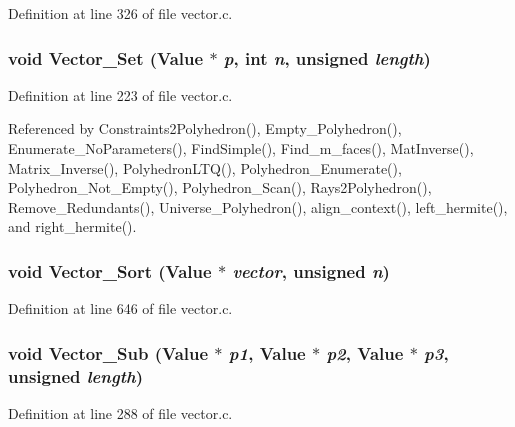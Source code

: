 Definition at line 326 of file vector.c.
\subsubsection{\setlength{\rightskip}{0pt plus 5cm}void Vector\_\-Set (Value $\ast$ {\em p}, int {\em n}, unsigned {\em length})}\label{vector_8c_a9}




Definition at line 223 of file vector.c.

Referenced by Constraints2Polyhedron(), Empty\_\-Polyhedron(), Enumerate\_\-No\-Parameters(), Find\-Simple(), Find\_\-m\_\-faces(), Mat\-Inverse(), Matrix\_\-Inverse(), Polyhedron\-LTQ(), Polyhedron\_\-Enumerate(), Polyhedron\_\-Not\_\-Empty(), Polyhedron\_\-Scan(), Rays2Polyhedron(), Remove\_\-Redundants(), Universe\_\-Polyhedron(), align\_\-context(), left\_\-hermite(), and right\_\-hermite().

\subsubsection{\setlength{\rightskip}{0pt plus 5cm}void Vector\_\-Sort (Value $\ast$ {\em vector}, unsigned {\em n})}\label{vector_8c_a28}




Definition at line 646 of file vector.c.
\subsubsection{\setlength{\rightskip}{0pt plus 5cm}void Vector\_\-Sub (Value $\ast$ {\em p1}, Value $\ast$ {\em p2}, Value $\ast$ {\em p3}, unsigned {\em length})}\label{vector_8c_a13}




Definition at line 288 of file vector.c.